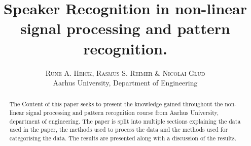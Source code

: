 

\title{
	\vspace{-15mm}
	\fontsize{24pt}{10pt}
	\selectfont
	\textbf{Speaker Recognition in non-linear signal processing and pattern recognition.
	}
}

\author{
	\large
	\textsc{Rune A. Heick, Rasmus S. Reimer \& Nicolai Glud }\\[2mm]
	\normalsize Aarhus University, Department of Engineering \\
	\vspace{-5mm}
}
\date{}




\maketitle
\thispagestyle{fancy} %
\raggedright



\begin{abstract}
The Content of this paper seeks to present the knowledge gained throughout the non-linear signal processing and pattern recognition course from Aarhus University, department of engineering. The paper is split into multiple sections explaining the data used in the paper, the methods used to process the data and the methods used for categorising the data. The results are presented along with a discussion of the results. 
\end{abstract}






\begingroup
	\raggedright
	
\endgroup


